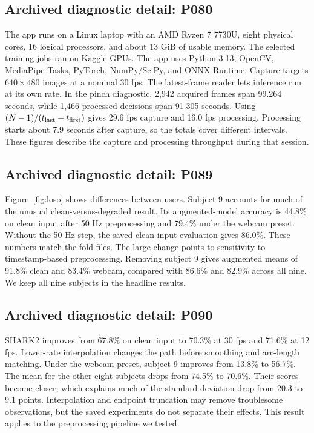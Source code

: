 \subsection*{Archived diagnostic detail: P080}
The app runs on a Linux laptop with an AMD Ryzen 7 7730U, eight physical cores, 16 logical processors, and about 13 GiB of usable memory. The selected training jobs ran on Kaggle GPUs. The app uses Python 3.13, OpenCV, MediaPipe Tasks, PyTorch, NumPy/SciPy, and ONNX Runtime. Capture targets $640\times480$ images at a nominal 30 fps. The latest-frame reader lets inference run at its own rate. In the pinch diagnostic, 2,942 acquired frames span 99.264 seconds, while 1,466 processed decisions span 91.305 seconds. Using $(N-1)/(t_{\rm last}-t_{\rm first})$ gives 29.6 fps capture and 16.0 fps processing. Processing starts about 7.9 seconds after capture, so the totals cover different intervals. These figures describe the capture and processing throughput during that session.

\subsection*{Archived diagnostic detail: P089}
Figure~\ref{fig:loso} shows differences between users. Subject 9 accounts for much of the unusual clean-versus-degraded result. Its augmented-model accuracy is 44.8\% on clean input after 50 Hz preprocessing and 79.4\% under the webcam preset. Without the 50 Hz step, the saved clean-input evaluation gives 86.0\%. These numbers match the fold files. The large change points to sensitivity to timestamp-based preprocessing. Removing subject 9 gives augmented means of 91.8\% clean and 83.4\% webcam, compared with 86.6\% and 82.9\% across all nine. We keep all nine subjects in the headline results.

\subsection*{Archived diagnostic detail: P090}
SHARK2 improves from 67.8\% on clean input to 70.3\% at 30 fps and 71.6\% at 12 fps. Lower-rate interpolation changes the path before smoothing and arc-length matching. Under the webcam preset, subject 9 improves from 13.8\% to 56.7\%. The mean for the other eight subjects drops from 74.5\% to 70.6\%. Their scores become closer, which explains much of the standard-deviation drop from 20.3 to 9.1 points. Interpolation and endpoint truncation may remove troublesome observations, but the saved experiments do not separate their effects. This result applies to the preprocessing pipeline we tested.

